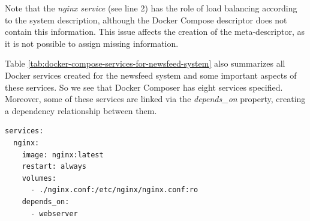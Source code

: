 \documentclass[sigconf]{acmart}
\begin{document}
Note that the \textit{nginx service} (see line 2) has the role of load balancing according to the system description, although the Docker Compose descriptor does not contain this information. This issue affects the creation of the meta-descriptor, as it is not possible to assign missing information.

Table \ref{tab:docker-compose-services-for-newsfeed-system} also summarizes all Docker services created for the newsfeed system and some important aspects of these services. So we see that Docker Composer has eight services specified. Moreover, some of these services are linked via the \textit{depends\_on} property, creating a dependency relationship between them.

\begin{lstlisting}[caption={Docker Compose newsfeed system descriptor}, label={lst:docker-compose-newsfeed-system-descriptor}]
services:
  nginx:
    image: nginx:latest
    restart: always
    volumes:
      - ./nginx.conf:/etc/nginx/nginx.conf:ro
    depends_on:
      - webserver
\end{lstlisting}

\begin{table}[]
\caption{Docker Compose services for newsfeed system}
\label{tab:docker-compose-services-for-newsfeed-system}
\end{table}
\end{document}
